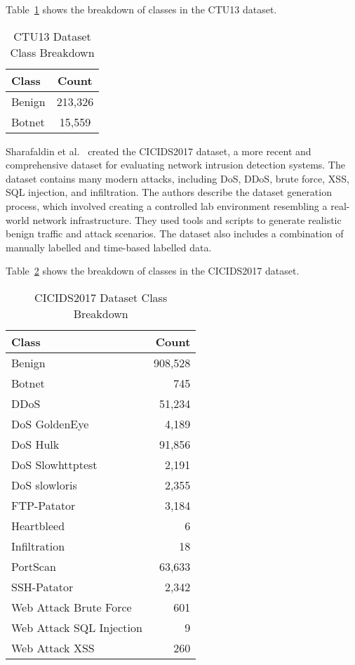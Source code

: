 Table~\ref{tab:ctu13_breakdown} shows the breakdown of classes in the CTU13 dataset.

\begin{table}[ht]
    \centering
    \begin{tabular}{|l|c|} 
    \hline
    \textbf{Class} & \textbf{Count} \\
    \hline
    Benign & 213,326 \\
    \hline
    Botnet & 15,559 \\
    \hline
    \end{tabular}
    \caption{CTU13 Dataset Class Breakdown}\label{tab:ctu13_breakdown}
\end{table}

Sharafaldin et al.~\cite{sharafaldin2018toward} created the CICIDS2017 dataset, a more recent and comprehensive dataset for evaluating network intrusion detection systems. The dataset contains many modern attacks, including DoS, DDoS, brute force, XSS, SQL injection, and infiltration. The authors describe the dataset generation process, which involved creating a controlled lab environment resembling a real-world network infrastructure. They used tools and scripts to generate realistic benign traffic and attack scenarios. The dataset also includes a combination of manually labelled and time-based labelled data.

Table~\ref{tab:cicids2017_breakdown} shows the breakdown of classes in the CICIDS2017 dataset.

\begin{table}[ht]
    \centering
    \begin{tabular}{|l|r|} 
    \hline
    \textbf{Class} & \textbf{Count} \\
    \hline
    Benign & 908,528 \\
    Botnet & 745 \\
    DDoS & 51,234 \\
    DoS GoldenEye & 4,189 \\
    DoS Hulk & 91,856 \\
    DoS Slowhttptest & 2,191 \\
    DoS slowloris & 2,355 \\
    FTP-Patator & 3,184 \\
    Heartbleed & 6 \\
    Infiltration & 18 \\
    PortScan & 63,633 \\
    SSH-Patator & 2,342 \\
    Web Attack Brute Force & 601 \\
    Web Attack SQL Injection & 9 \\
    Web Attack XSS & 260 \\
    \hline
    \end{tabular}
    \caption{CICIDS2017 Dataset Class Breakdown}\label{tab:cicids2017_breakdown}
\end{table}

